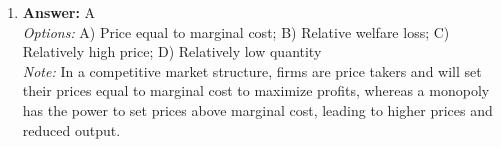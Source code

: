 \documentclass[12pt]{article}
\begin{document}
\begin{enumerate}[label=\arabic*.]
\\ \textit{Note:} The value of the U.S. dollar is insured by the trust and confidence in the U.S. government's ability to maintain economic stability and uphold its obligations, which underpins the currency's acceptance and value in the economy.
\item \textbf{Answer:} A
\\ \textit{Options:} A) Price equal to marginal cost; B) Relative welfare loss; C) Relatively high price; D) Relatively low quantity
\\ \textit{Note:} In a competitive market structure, firms are price takers and will set their prices equal to marginal cost to maximize profits, whereas a monopoly has the power to set prices above marginal cost, leading to higher prices and reduced output.
\end{enumerate}
\end{document}
